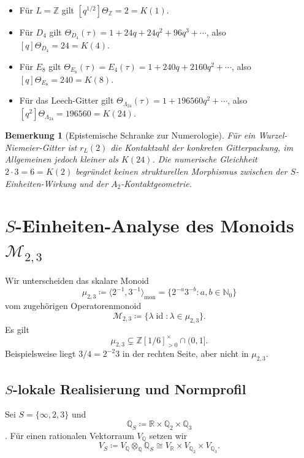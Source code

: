 \documentclass[11pt,a4paper]{article}
\newtheorem{remark}[theorem]{Bemerkung}
\newcommand{\id}{\operatorname{id}}
\newcommand{\Mmon}{\mathcal{M}_{2,3}}
\newcommand{\mmon}{\mu_{2,3}}
\begin{document}
\begin{itemize}
  \item Für $L=\mathbb{Z}$ gilt $[q^{1/2}]\Theta_{\mathbb{Z}}=2=K(1)$.
  \item Für $D_4$ gilt $\Theta_{D_4}(\tau)=1+24q+24q^2+96q^3+\cdots$, also $[q]\Theta_{D_4}=24=K(4)$.
  \item Für $E_8$ gilt $\Theta_{E_8}(\tau)=E_4(\tau)=1+240q+2160q^2+\cdots$, also $[q]\Theta_{E_8}=240=K(8)$.
  \item Für das Leech-Gitter gilt $\Theta_{\Lambda_{24}}(\tau)=1+196560q^2+\cdots$, also $[q^2]\Theta_{\Lambda_{24}}=196560=K(24)$.
\end{itemize}

\begin{remark}[Epistemische Schranke zur Numerologie]
Für ein Wurzel-Niemeier-Gitter ist $r_L(2)$ die Kontaktzahl der konkreten Gitterpackung, im Allgemeinen jedoch kleiner als $K(24)$. Die numerische Gleichheit $2\cdot3=6=K(2)$ begründet keinen strukturellen Morphismus zwischen der $S$-Einheiten-Wirkung und der $A_2$-Kontaktgeometrie.
\end{remark}

\section{$S$-Einheiten-Analyse des Monoids $\Mmon$}
Wir unterscheiden das skalare Monoid
\begin{equation}
\mmon\coloneqq\langle2^{-1},3^{-1}\rangle_{\mathrm{mon}}=\{2^{-a}3^{-b}:a,b\in\mathbb{N}_0\}
\end{equation}
vom zugehörigen Operatorenmonoid
\begin{equation}
\Mmon\coloneqq\{\lambda\id:\lambda\in\mmon\}.
\end{equation}
Es gilt
\begin{equation}
\mmon\subsetneq\mathbb{Z}[1/6]_{>0}^{\times}\cap(0,1].
\end{equation}
Beispielsweise liegt $3/4=2^{-2}3$ in der rechten Seite, aber nicht in $\mmon$.

\subsection{$S$-lokale Realisierung und Normprofil}
Sei $S=\{\infty,2,3\}$ und
\[
\mathbb{Q}_S\coloneqq\mathbb{R}\times\mathbb{Q}_2\times\mathbb{Q}_3
\]
\cite{weil}. Für einen rationalen Vektorraum $V_{\mathbb{Q}}$ setzen wir
\[
V_S\coloneqq V_{\mathbb{Q}}\otimes_{\mathbb{Q}}\mathbb{Q}_S\cong V_{\mathbb{R}}\times V_{\mathbb{Q}_2}\times V_{\mathbb{Q}_3}.
\]
\end{document}
